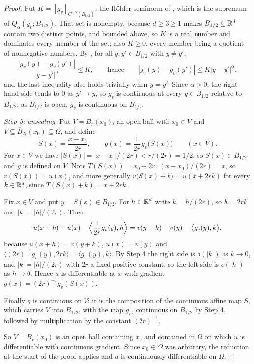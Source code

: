 \begin{proof}
Put $K=[g_v]_{C^{0,\alpha}(B_{1/2})}$, the H\"older seminorm of
, which is the supremum of
$Q_\alpha(g_v;B_{1/2})$. That set is nonempty, because $d\ge3\ge1$ makes
$B_{1/2}\subseteq\mathbb{R}^d$ contain two distinct points, and bounded above, so $K$ is
a real number and dominates every member of the set; also $K\ge0$, every member
being a quotient of nonnegative numbers. By , for all
$y,y'\in B_{1/2}$ with $y\ne y'$,
\[
  \frac{|g_v(y)-g_v(y')|}{|y-y'|^\alpha}\le K,
  \qquad\text{hence}\qquad
  |g_v(y)-g_v(y')|\le K|y-y'|^\alpha ,
\]
and the last inequality also holds trivially when $y=y'$. Since $\alpha>0$, the
right-hand side tends to $0$ as $y'\to y$, so $g_v$ is continuous at every
$y\in B_{1/2}$ relative to $B_{1/2}$; as $B_{1/2}$ is open, $g_v$ is continuous
on $B_{1/2}$.

\emph{Step 5: unscaling.}
Put $V=B_r(x_0)$, an open ball with $x_0\in V$ and
$V\subseteq\overline B_{2r}(x_0)\subseteq\Omega$, and define
\[
  S(x)=\frac{x-x_0}{2r},\qquad g(x)=\frac{1}{2r}\,g_v\bigl(S(x)\bigr)
  \qquad(x\in V).
\]
For $x\in V$ we have $|S(x)|=|x-x_0|/(2r)<r/(2r)=1/2$, so $S(x)\in B_{1/2}$ and
$g$ is defined on $V$. Note $T(S(x))=x_0+2r\cdot(x-x_0)/(2r)=x$, so
$v(S(x))=u(x)$, and more generally $v\bigl(S(x)+k\bigr)=u(x+2rk)$ for every
$k\in\mathbb{R}^d$, since $T(S(x)+k)=x+2rk$.

Fix $x\in V$ and put $y=S(x)\in B_{1/2}$. For $h\in\mathbb{R}^d$ write $k=h/(2r)$, so
$h=2rk$ and $|k|=|h|/(2r)$. Then
\[
  u(x+h)-u(x)-\Bigl\langle\frac{1}{2r}g_v(y),h\Bigr\rangle
   =v(y+k)-v(y)-\bigl\langle g_v(y),k\bigr\rangle ,
\]
because $u(x+h)=v(y+k)$, $u(x)=v(y)$ and
$\langle(2r)^{-1}g_v(y),2rk\rangle=\langle g_v(y),k\rangle$. By Step 4 the right
side is $o(|k|)$ as $k\to0$, and $|k|=|h|/(2r)$ with $2r$ a fixed positive
constant, so the left side is $o(|h|)$ as $h\to0$. Hence $u$ is differentiable at
$x$ with gradient $g(x)=(2r)^{-1}g_v(S(x))$.

Finally $g$ is continuous on $V$: it is the composition of the continuous affine
map $S$, which carries $V$ into $B_{1/2}$, with the map $g_v$, continuous on
$B_{1/2}$ by Step 4, followed by multiplication by the constant $(2r)^{-1}$.

So $V=B_r(x_0)$ is an open ball containing $x_0$ and contained in $\Omega$ on
which $u$ is differentiable with continuous gradient. Since $x_0\in\Omega$ was
arbitrary, the reduction at the start of the proof applies and $u$ is
continuously differentiable on $\Omega$.
\end{proof}
